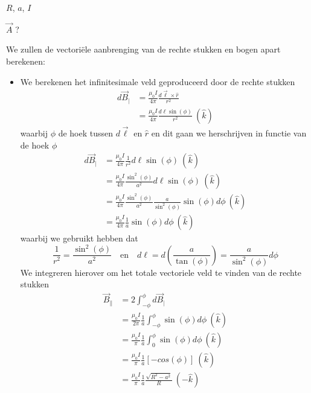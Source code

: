 \begin{description}[labelwidth=1.5cm, leftmargin=!]
    \item[Geg. :]   $R$, $a$, $I$
    \item[Gevr. :]  $\Vec{A}$ ?
    \item[Opl. :]  
    We zullen de vectoriële aanbrenging van de rechte stukken en bogen apart berekenen:
    \begin{itemize}
        \item 
            We berekenen het infinitesimale veld geproduceerd door de rechte stukken
            \begin{align*}
                d\Vec{B}_{|}
                &= \frac{\mu_0I}{4\pi}\frac{d\Vec{\ell}\times\hat{r}}{r^2} \\
                &= \frac{\mu_0I}{4\pi}\frac{d\ell\sin(\phi)}{r^2} \ (\hat{k}) 
            \end{align*}
            waarbij $\phi$ de hoek tussen $d\Vec{\ell}$ en $\hat{r}$ en dit gaan we herschrijven in functie van de hoek $\phi$ 
            \begin{align*}
                d\Vec{B}_{|}
                &= \frac{\mu_0I}{4\pi}\frac{1}{r^2} d\ell\sin(\phi) \ (\hat{k}) \\
                &= \frac{\mu_0I}{4\pi}\frac{\sin^2(\phi)}{a^2} d\ell \sin(\phi) \ (\hat{k}) \\ 
                &= \frac{\mu_0I}{4\pi}\frac{\sin^2(\phi)}{a^2} \frac{a}{\sin^2(\phi)} \sin(\phi) d\phi \ (\hat{k}) \\
                &= \frac{\mu_0I}{4\pi}\frac{1}{a}\sin(\phi) d\phi \ (\hat{k})
            \end{align*}
            waarbij we gebruikt hebben dat
            \begin{equation*}
                \frac{1}{r^2} = \frac{\sin^2(\phi)}{a^2}  \quad \text{en} \quad d\ell = d\left(\frac{a}{\tan(\phi)}\right) = \frac{a}{\sin^2(\phi)}d\phi         
            \end{equation*}
            We integreren hierover om het totale vectoriele veld te vinden van de rechte stukken
            \begin{align*}
                \Vec{B}_{\parallel}
                &= 2\int_{-\phi}^{\phi} d\Vec{B}_{|} \\
                &= \frac{\mu_0I}{2\pi}\frac{1}{a}\int_{-\phi}^{\phi}\sin(\phi)d\phi \ (\hat{k}) \\
                &= \frac{\mu_0I}{\pi}\frac{1}{a}\int_{0}^{\phi}\sin(\phi)d\phi \ (\hat{k}) \\
                &= \frac{\mu_0I}{\pi}\frac{1}{a}\left[-cos(\phi)\right] \ (\hat{k}) \\
                &= \frac{\mu_0I}{\pi}\frac{1}{a}\frac{\sqrt{R^2-a^2}}{R}\ (-\hat{k}) 
            \end{align*}


\end{itemize}
\end{description}
